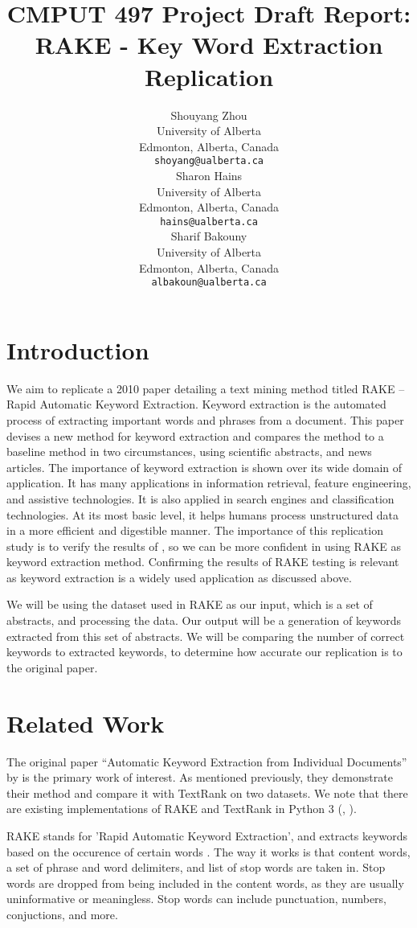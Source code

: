\documentclass[11pt,a4paper]{article}
\title{CMPUT 497 Project Draft Report: \\ RAKE - Key Word Extraction Replication}
\author{Shouyang Zhou \\
  University of Alberta \\
  Edmonton, Alberta, Canada \\
  {\tt shoyang@ualberta.ca} \\\And
  Sharon Hains \\
  University of Alberta \\
  Edmonton, Alberta, Canada \\
  {\tt hains@ualberta.ca} \\\And
  Sharif Bakouny \\
  University of Alberta \\
  Edmonton, Alberta, Canada \\
  {\tt albakoun@ualberta.ca} \\}
\date{}
\begin{document}
\maketitle

\section{Introduction}

We aim to replicate a 2010 paper detailing a text mining method titled RAKE – Rapid Automatic Keyword Extraction. Keyword extraction is the automated process of extracting important words and phrases from a document. This paper devises a new method for keyword extraction and compares the method to a baseline method in two circumstances, using scientific abstracts, and news articles. The importance of keyword extraction is shown over its wide domain of application. It has many applications in information retrieval, feature engineering, and assistive technologies.  It is also applied in search engines and classification technologies. At its most basic level, it helps humans process unstructured data in a more efficient and digestible manner. The importance of this replication study is to verify the results of \citet{1}, so we can be more confident in using RAKE as keyword extraction method. Confirming the results of RAKE testing is relevant as keyword extraction is a widely used application as discussed above. 

We will be using the dataset used in RAKE as our input, which is a set of abstracts, and processing the data. Our output will be a generation of keywords extracted from this set of abstracts. We will be comparing the number of correct keywords to extracted keywords, to determine how accurate our replication is to the original paper. 

\section{Related Work}

The original paper “Automatic Keyword Extraction from Individual Documents” by \citet{1} is the primary work of interest. As mentioned previously, they demonstrate their method and compare it with TextRank on two datasets. We note that there are existing implementations of RAKE and TextRank in Python 3 (\citet{2}, \citet{3}).

RAKE stands for 'Rapid Automatic Keyword Extraction', and extracts keywords based on the occurence of certain words \citep{1}. The way it works is that content words, a set of phrase and word delimiters, and list of stop words are taken in. Stop words are dropped from being included in the content words, as they are usually uninformative or meaningless. Stop words can include punctuation, numbers, conjuctions, and more. 
\end{document}
